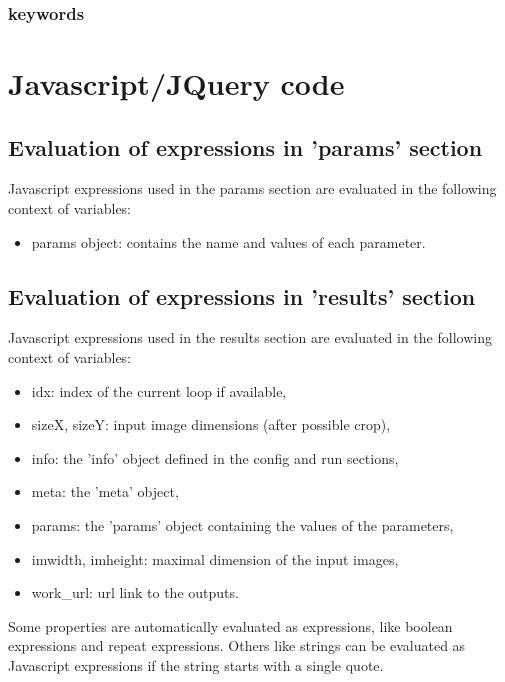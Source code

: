 \subsubsection{keywords}

\section{Javascript/JQuery code}

\subsection{Evaluation of expressions in 'params' section} \label{sec:JavascriptEvalParams}

Javascript expressions used in the params section are evaluated in the 
following context of variables:
\begin{itemize}
  \item params object: contains the name and values of each parameter.
\end{itemize}

\subsection{Evaluation of expressions in 'results' section} \label{sec:JavascriptEval}

Javascript expressions used in the results section are evaluated in the 
following context of variables:
\begin{itemize}
  \item idx: index of the current loop if available,
  \item sizeX, sizeY: input image dimensions (after possible crop),
  \item info: the 'info' object defined in the config and run sections,
  \item meta: the 'meta' object,
  \item params: the 'params' object containing the values of the parameters,
  \item imwidth, imheight: maximal dimension of the input images,
  \item work\_url: url link to the outputs.
\end{itemize}

Some properties are automatically evaluated as expressions, like boolean expressions
and repeat expressions. Others like strings can be evaluated as Javascript expressions
if the string starts with a single quote.


